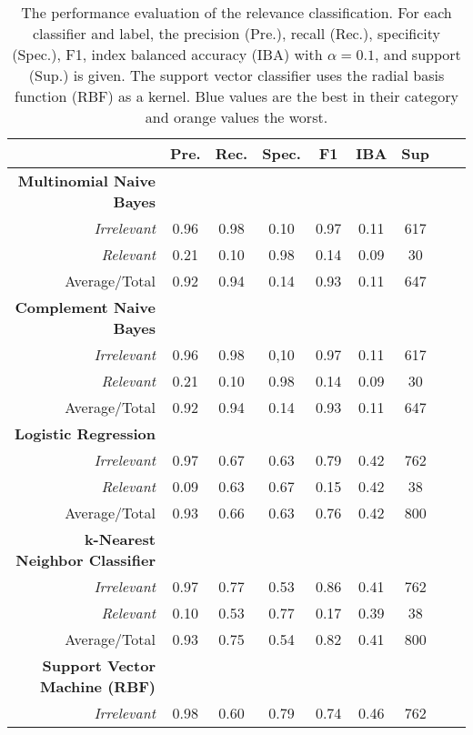   \begin{table}[h!]
    \caption{The performance evaluation of the relevance classification. For each classifier and label, the precision (Pre.), recall (Rec.), specificity (Spec.), F1, index balanced accuracy (IBA) with $\alpha = 0.1$, and support (Sup.) is given. The support vector classifier uses the radial basis function (RBF) as a kernel. Blue values are the best in their category and orange values the worst.}
    \centering
    \begin{tabular}{@{}rcccccccc@{}}
      \toprule
       & \textbf{Pre.} & \textbf{Rec.} & \textbf{Spec.}
      & \textbf{F1} &  \textbf{IBA}& \textbf{Sup} \\
      \midrule
      \textbf{Multinomial Naive Bayes}\\
      \textsl{Irrelevant}& 0.96& 0.98&  0.10& 0.97& 0.11& 617 \\
      \textsl{Relevant}& 0.21& 0.10&  0.98& 0.14& 0.09& 30 \\
      Average/Total& 0.92& 0.94& 0.14& 0.93& 0.11& 647 \vspace{2mm}\\
      \textbf{Complement Naive Bayes}\\
      \textsl{Irrelevant}& 0.96& 0.98&  0,10& 0.97& 0.11& 617 \\
      \textsl{Relevant}& 0.21& 0.10&  0.98& 0.14& 0.09& 30 \\
      Average/Total& 0.92& 0.94& 0.14& 0.93& 0.11& 647 \vspace{2mm}\\
      \textbf{Logistic Regression}\\
      \textsl{Irrelevant}& 0.97& 0.67&  0.63& 0.79& 0.42& 762 \\
      \textsl{Relevant}& 0.09& 0.63&  0.67& 0.15& 0.42& 38 \\
      Average/Total& 0.93& 0.66& 0.63& 0.76& 0.42& 800 \vspace{2mm}\\
      \textbf{k-Nearest Neighbor Classifier}\\
      \textsl{Irrelevant}& 0.97& 0.77&  0.53& 0.86& 0.41& 762 \\
      \textsl{Relevant}& 0.10& 0.53&  0.77& 0.17& 0.39& 38 \\
      Average/Total& 0.93& 0.75& 0.54& 0.82& 0.41& 800 \vspace{2mm}\\
      \textbf{Support Vector Machine (RBF)}\\
      \textsl{Irrelevant}& 0.98& 0.60&  0.79& 0.74& 0.46& 762 \\

\end{tabular}
\end{table}
